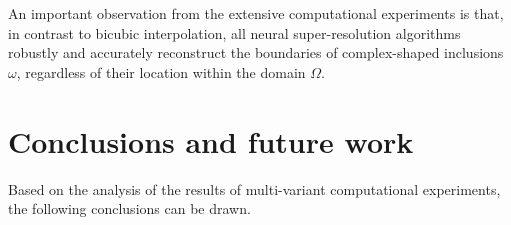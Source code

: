 \documentclass{ieeeaccess}
\begin{document}
An important observation from the extensive computational experiments is that, in contrast to bicubic interpolation, all neural super-resolution algorithms robustly and accurately reconstruct the boundaries of complex-shaped inclusions $\omega$, regardless of their location within the domain $\Omega$.




\section{Conclusions and future work}

Based on the analysis of the results of multi-variant computational experiments, the following conclusions can be drawn.
\end{document}
